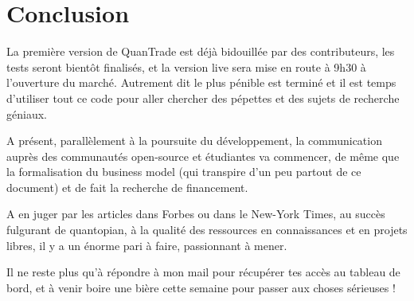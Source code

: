 \section*{Conclusion}


La première version de QuanTrade est déjà bidouillée par des contributeurs,
les tests seront bientôt finalisés, et la version live sera mise
en route à 9h30 à l'ouverture du marché. Autrement dit le plus pénible est terminé et il est temps
d'utiliser tout ce code pour aller chercher des pépettes et des sujets de
recherche géniaux.\newline

A présent, parallèlement à la poursuite du développement, la communication
auprès des communautés open-source et étudiantes va commencer, de même que
la formalisation du business model (qui transpire d'un peu partout de ce
document) et de fait la recherche de financement.\newline

A en juger par les articles dans Forbes ou dans le New-York Times, au
succès fulgurant de quantopian, à la qualité des ressources en
connaissances et en projets libres, il y a un énorme pari à faire, passionnant à mener.\newline

Il ne reste plus qu'à répondre à mon mail pour récupérer tes accès au tableau
de bord, et à venir boire une bière cette semaine pour passer aux
choses sérieuses !
